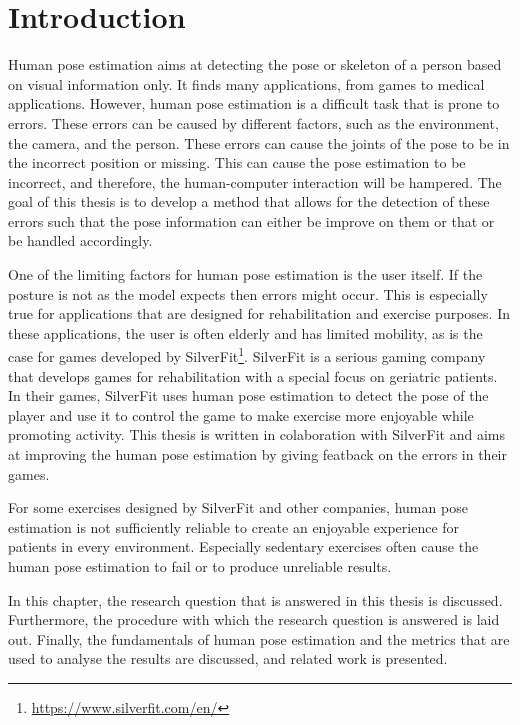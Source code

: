 \chapter{Introduction}
\setcounter{page}{1}
Human pose estimation aims at detecting the pose or skeleton of a person based on visual information only. It finds many applications, from games to medical applications\cite{kumarapu2020animepose, ClinicalApplicationChen, MedicalAnimation}. However, human pose estimation is a difficult task that is prone to errors\cite{HPEIsHard}. These errors can be caused by different factors, such as the environment, the camera, and the person. These errors can cause the joints of the pose to be in the incorrect position or missing. This can cause the pose estimation to be incorrect, and therefore, the human-computer interaction will be hampered. The goal of this thesis is to develop a method that allows for the detection of these errors such that the pose information can either be improve on them or that or be handled accordingly.

One of the limiting factors for human pose estimation is the user itself. If the posture is not as the model expects then errors might occur. This is especially true for applications that are designed for rehabilitation and exercise purposes. In these applications, the user is often elderly and has limited mobility, as is the case for games developed by SilverFit\footnote{\url{https://www.silverfit.com/en/}}. SilverFit is a serious gaming company that develops games for rehabilitation with a special focus on geriatric patients. In their games, SilverFit uses human pose estimation to detect the pose of the player and use it to control the game to make exercise more enjoyable while promoting activity. This thesis is written in colaboration with SilverFit and aims at improving the human pose estimation by giving featback on the errors in their games.

For some exercises designed by SilverFit and other companies, human pose estimation is not sufficiently reliable to create an enjoyable experience for patients in every environment. Especially sedentary exercises often cause the human pose estimation to fail or to produce unreliable results.

In this chapter, the research question that is answered in this thesis is discussed. Furthermore, the procedure with which the research question is answered is laid out. Finally, the fundamentals of human pose estimation and the metrics that are used to analyse the results are discussed, and related work is presented.




